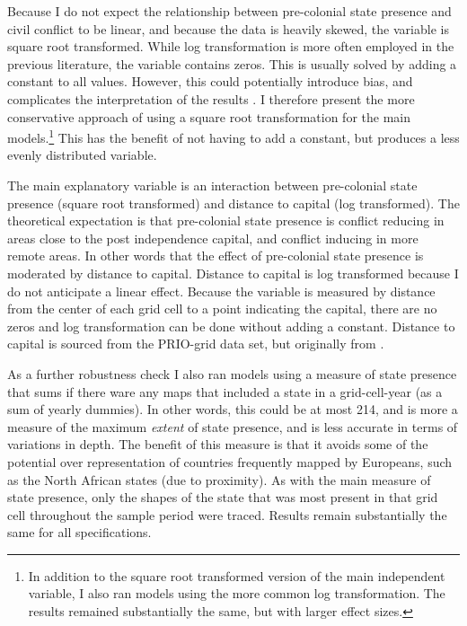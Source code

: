 \documentclass[12pt]{article}
\begin{document}

Because I do not expect the relationship between pre-colonial state presence and
civil conflict to be linear, and because the data is heavily skewed, the
variable is square root transformed. While log transformation is more often
employed in the previous literature, the variable contains zeros. This is
usually solved by adding a constant to all values. However, this could
potentially introduce bias, and complicates the interpretation of the results
\citep{Ekwaru_2018}. I therefore present the more conservative approach of using
a square root transformation for the main models.\footnote{In addition to the
	square root transformed version of the main independent variable, I also
	ran models using the more common log transformation. The results
remained substantially the same, but with larger effect sizes.} This has the
benefit of not having to add a constant, but produces a less evenly distributed
variable. 

The main explanatory variable is an interaction between pre-colonial state
presence (square root transformed) and distance to capital (log transformed).
The theoretical expectation is that pre-colonial state presence is conflict
reducing in areas close to the post independence capital, and conflict inducing
in more remote areas. In other words that the effect of pre-colonial state
presence is moderated by distance to capital. Distance to capital is log
transformed because I do not anticipate a linear effect. Because the variable is
measured by distance from the center of each grid cell to a point indicating the
capital, there are no zeros and log transformation can be done without adding a
constant. Distance to capital is sourced from the PRIO-grid data set, but
originally from \citet{Weidmann2010a}.

As a further robustness check I also ran models using a measure of state
presence that sums if there ware any maps that included a state in a
grid-cell-year (as a sum of yearly dummies). In other words, this could be at
most 214, and is more a measure of the maximum \textit{extent} of state
presence, and is less accurate in terms of variations in depth. The benefit of
this measure is that it avoids some of the potential over representation of
countries frequently mapped by Europeans, such as the North African states (due
to proximity). As with the main measure of state presence, only the shapes of
the state that was most present in that grid cell throughout the sample period
were traced. Results remain substantially the same for all specifications.
\end{document}
